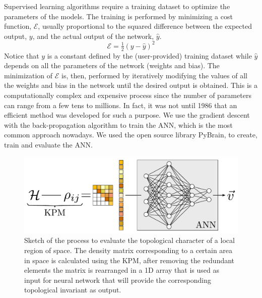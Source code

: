 Supervised learning algorithms require a training dataset to optimize the
parameters of the models. The training is performed by minimizing a cost
function, $\mathcal{E}$, usually proportional to the squared difference between
the expected output, $y$, and the actual output of the network, $\hat{y}$.
\begin{equation}
  \mathcal{E}=\tfrac{1}{2}(y-\hat{y})^2
\end{equation}
Notice that $y$ is a constant defined by the (user-provided) training dataset
while $\hat{y}$ depends on all the parameters of the network (weights and bias).
The minimization of $\mathcal{E}$ is, then, performed by iteratively modifying
the values of all the weights and bias in the network until the desired output
is obtained.
This is a computationally complex and expensive process since the number of
parameters can range from a few tens to millions. In fact, it was not until 1986
that an efficient method was developed for such a purpose.\cite{Rumelhart1986}
We use the gradient descent with the back-propagation algorithm to train the
ANN, which is the most common approach nowadays.
We used the open source library PyBrain,\cite{pybrain2010jmlr} to create, train and evaluate the ANN.



\begin{figure}[t!]
\centering
\includegraphics[width=\columnwidth]{ann/figures/fig2.pdf}
\vspace{-5pt}
\caption{
Sketch of the process to evaluate the topological character of a local region
of space. The density matrix corresponding to a certain area in space is
calculated using the KPM, after removing the redundant elements the matrix is
rearranged in a 1D array that is used as input for neural network that will
provide the corresponding topological invariant as output.
}
\label{fig_method}
\end{figure}



